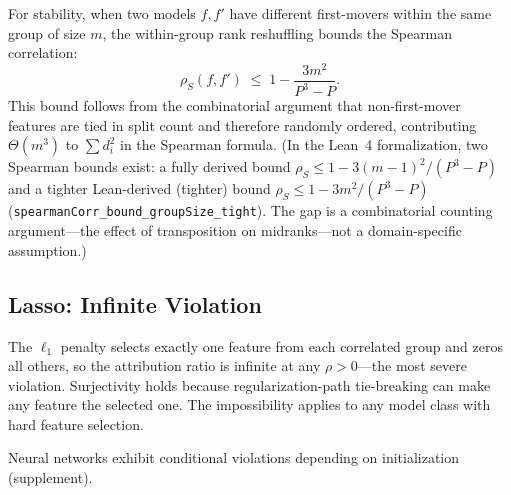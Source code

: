 \documentclass{article}
\newcommand{\GBDT}{\textsc{GBDT}}
\begin{document}
For stability, when two models $f, f'$ have different first-movers within the same group of size $m$, the within-group rank reshuffling bounds the Spearman correlation:
\[
    \rho_S(f, f') \;\leq\; 1 - \frac{3m^2}{P^3{-}P}.
\]
This bound follows from the combinatorial argument that non-first-mover features are tied in split count and therefore randomly ordered, contributing $\Theta(m^3)$ to $\sum d_i^2$ in the Spearman formula.
(In the Lean~4 formalization, two Spearman bounds exist: a fully derived bound $\rho_S \leq 1 - 3(m{-}1)^2/(P^3{-}P)$ and a tighter Lean-derived (tighter) bound $\rho_S \leq 1 - 3m^2/(P^3{-}P)$ (\texttt{spearmanCorr\_bound\_groupSize\_tight}). The gap is a combinatorial counting argument---the effect of transposition on midranks---not a domain-specific assumption.)

\subsection{Lasso: Infinite Violation}
\label{sec:lasso}

The $\ell_1$ penalty selects exactly one feature from each correlated group and zeros all others, so the attribution ratio is infinite at any $\rho > 0$---the most severe violation.
Surjectivity holds because regularization-path tie-breaking can make any feature the selected one.
The impossibility applies to any model class with hard feature selection.

Neural networks exhibit conditional violations depending on initialization (supplement).
\end{document}
